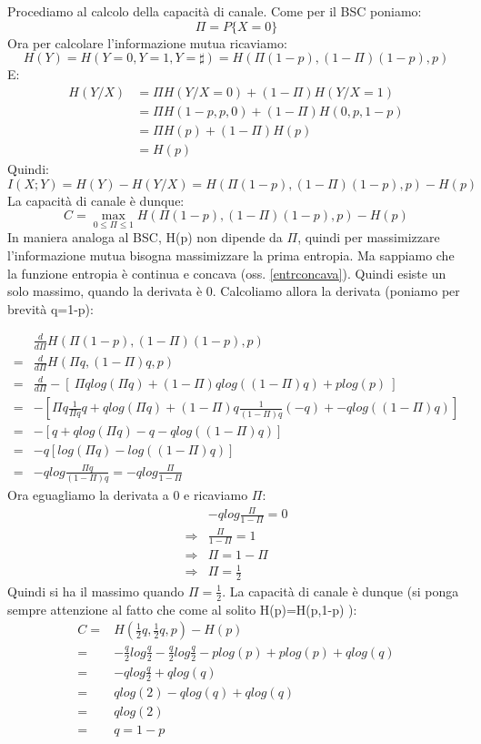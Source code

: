 \noindent
Procediamo al calcolo della capacità di canale. Come per il BSC poniamo:
\[
 \Pi=P\{X=0\}
\]
Ora per calcolare l'informazione mutua ricaviamo:
\[
 H(Y)=H(Y=0,Y=1,Y=\sharp)=H(\Pi (1-p), (1-\Pi) (1-p), p)
\]
E:
\[\begin{split}
 H(Y/X)&=\Pi H(Y/X=0) + (1-\Pi) H(Y/X=1) \\
       &=\Pi H(1-p,p,0) + (1-\Pi) H(0,p,1-p) \\
       &=\Pi H(p) + (1-\Pi) H(p) \\
       &=H(p)
  \end{split}
\]
Quindi:
\[
 I(X;Y)=H(Y)-H(Y/X)=H(\Pi (1-p), (1-\Pi) (1-p), p) - H(p)
\]
La capacità di canale è dunque:
\[
 C=\max_{0 \le \Pi \le 1} H(\Pi (1-p), (1-\Pi) (1-p), p) - H(p)
\]
In maniera analoga al BSC, H(p) non dipende da $\Pi$, quindi per massimizzare 
l'informazione mutua bisogna massimizzare la prima entropia.
Ma sappiamo che la funzione entropia è continua e concava (oss. \ref{entrconcava}).
Quindi esiste un solo massimo, quando la derivata è 0. Calcoliamo allora la derivata
(poniamo per brevità q=1-p):

\[\begin{split}
 &\frac{d}{d \Pi}  H(\Pi (1-p), (1-\Pi) (1-p), p) \\
 =&\frac{d}{d \Pi} H(\Pi q, (1-\Pi) q, p) \\
 =&\frac{d}{d \Pi} - [ \ \Pi q log(\Pi q) + (1-\Pi) q log((1-\Pi)q) + plog(p) \ ] \\
 =&-[\Pi q \frac{1}{\Pi q} q + q log(\Pi q) + (1-\Pi)q \frac{1}{(1-\Pi)q} (-q) + -qlog((1-\Pi)q) ] \\
 =&-[q + q log(\Pi q) -q -qlog((1-\Pi)q) ] \\
 =&-q[log(\Pi q) -log((1-\Pi)q) ] \\
 =&-qlog \frac{\Pi q}{(1-\Pi)q}=-qlog \frac{\Pi}{1-\Pi}
  \end{split}
\]
Ora eguagliamo la derivata a 0 e ricaviamo $\Pi$:
\[\begin{split}
 &-qlog \frac{\Pi}{1-\Pi}=0 \\
 \Rightarrow &\frac{\Pi}{1-\Pi}=1 \\
 \Rightarrow &\Pi=1-\Pi \\
\Rightarrow &\Pi=\frac{1}{2}
  \end{split}
\]
Quindi si ha il massimo quando $\Pi=\frac{1}{2}$.
La capacità di canale è dunque (si ponga sempre attenzione al fatto che come al solito H(p)=H(p,1-p) ):
\[\begin{split}
C=&H(\frac{1}{2} q, \frac{1}{2} q, p) - H(p) \\
=& -\frac{q}{2} log\frac{q}{2} - \frac{q}{2} log\frac{q}{2}  - plog(p) +p log(p) +q log(q)\\
=&-qlog\frac{q}{2}+q log(q)  \\
=&qlog(2) -qlog(q) +q log(q)\\
=&qlog(2) \\
=&q=1-p
\end{split}
\]

